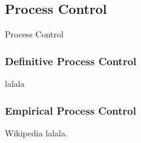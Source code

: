 \subsection{Process Control}

Process Control

\subsubsection{Definitive Process Control}

lalala\cite{wiki:definedprocess}

\subsubsection{Empirical Process Control}

Wikipedia\cite{wiki:empiricalprocess} lalala.